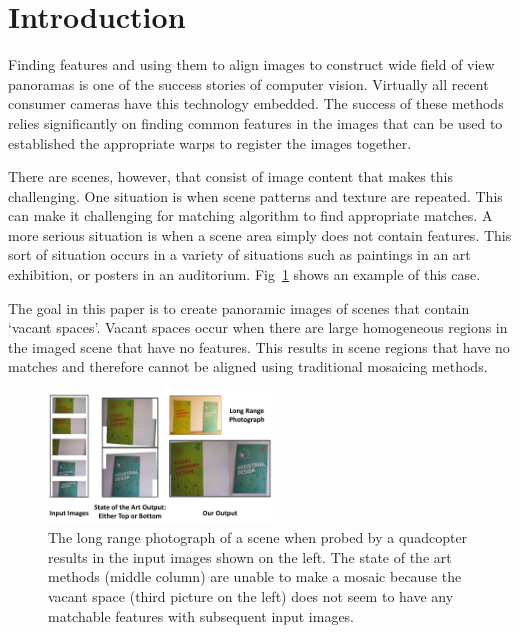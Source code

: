 \documentclass[10pt,twocolumn,letterpaper]{article}
\begin{document}
\section{Introduction}

Finding features and using them to align images to construct wide field
of view panoramas is one of the success stories of
computer vision.  Virtually all recent consumer cameras have this
technology embedded.  The success of these methods relies significantly on
finding common features in the images that can be used to established the
 appropriate warps to register the images together.

There are scenes, however, that consist of image content that makes this
challenging.  One situation is when scene patterns and texture are repeated.  
This can make it challenging for matching algorithm to find appropriate matches.
A more serious situation is when a scene area simply
does not contain features.  This sort of situation occurs in a variety
of situations such as paintings in an art exhibition, or posters in an
auditorium.  Fig~\ref{fig:teaser} shows an example of this case.

The goal in this paper is to create panoramic images of scenes that contain
`vacant spaces'.  Vacant spaces occur when there are large homogeneous regions in 
the imaged scene that have no features.   This results in scene regions that
have no matches and therefore cannot be aligned using traditional mosaicing methods.

\begin{figure}[t!]
  \centering
  \includegraphics[width=0.53\textwidth]{figures/teaser.pdf}
  \caption{ \label{fig:teaser} The long range photograph of a scene when probed
    by a quadcopter results in the input images shown on the left.  The
    state of the art methods (middle column) are unable to make a mosaic because the
    vacant space (third picture on the left) does not seem to have any
    matchable features with subsequent input images.
    }
\end{figure}
\end{document}
